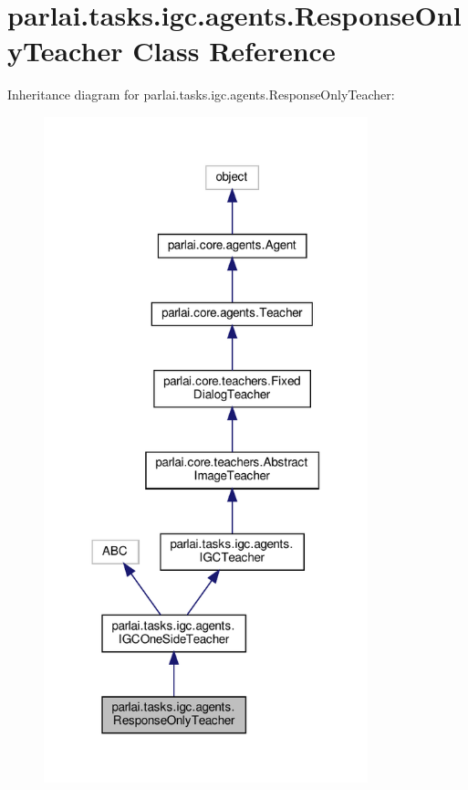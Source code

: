 \hypertarget{classparlai_1_1tasks_1_1igc_1_1agents_1_1ResponseOnlyTeacher}{}\section{parlai.\+tasks.\+igc.\+agents.\+Response\+Only\+Teacher Class Reference}
\label{classparlai_1_1tasks_1_1igc_1_1agents_1_1ResponseOnlyTeacher}


Inheritance diagram for parlai.\+tasks.\+igc.\+agents.\+Response\+Only\+Teacher\+:
\nopagebreak
\begin{figure}[H]
\begin{center}
\leavevmode
\includegraphics[width=266pt]{d3/d3b/classparlai_1_1tasks_1_1igc_1_1agents_1_1ResponseOnlyTeacher__inherit__graph}
\end{center}
\end{figure}


